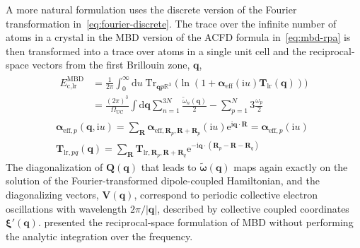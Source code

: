 A more natural formulation uses the discrete version of the Fourier transformation in~\eqref{eq:fourier-discrete}.
The trace over the infinite number of atoms in a crystal in the MBD version of the ACFD formula in~\eqref{eq:mbd-rpa} is then transformed into a trace over atoms in a single unit cell and the reciprocal-space vectors from the first Brillouin zone, $\mathbf q$,
\begin{gather}
\begin{aligned}
  E_\text{c,lr}^\text{MBD}
    &=\frac1{2\pi}\int_0^\infty\mathrm du
    \operatorname{Tr}_{\mathbf qp\mathbb R^3}\big(
      \ln(1+\boldsymbol\alpha_\text{eff}(\mathrm iu)\mathbf T_\text{lr}(\mathbf q))
    \!\big) \\
  &=\frac{(2\pi)^3}{\Omega_\text{UC}}\int\mathrm d\mathbf q\sum_{n=1}^{3N}\frac{\tilde\omega_n(\mathbf q)}2-\sum_{p=1}^N3\frac{\omega_p}2
\end{aligned} \\
\boldsymbol\alpha_{\text{eff},p}(\mathbf q,\mathrm iu)=\sum_{\mathbf R}\boldsymbol\alpha_{\text{eff},\mathbf R_p,\mathbf R+\mathbf R_p}(\mathrm iu)\mathrm e^{\mathrm i\mathbf q\cdot\mathbf R}=\boldsymbol\alpha_{\text{eff},p}(\mathrm iu) \\
\mathbf T_{\text{lr},pq}(\mathbf q)=\sum_{\mathbf R}\mathbf T_{\text{lr},\mathbf R_p,\mathbf R+\mathbf R_q}\mathrm e^{-\mathrm i\mathbf q\cdot(\mathbf R_p-\mathbf R-\mathbf R_q)}
\end{gather}
The diagonalization of $\mathbf Q(\mathbf q)$ that leads to $\tilde{\boldsymbol\omega}(\mathbf q)$ maps again exactly on the solution of the Fourier-transformed dipole-coupled Hamiltonian, and the diagonalizing vectors, $\mathbf V(\mathbf q)$, correspond to periodic collective electron oscillations with wavelength $2\pi/|\mathbf q|$, described by collective coupled coordinates $\boldsymbol\xi'(\mathbf q)$.
\citet{BuckoJPCM16} presented the reciprocal-space formulation of MBD without performing the analytic integration over the frequency.

